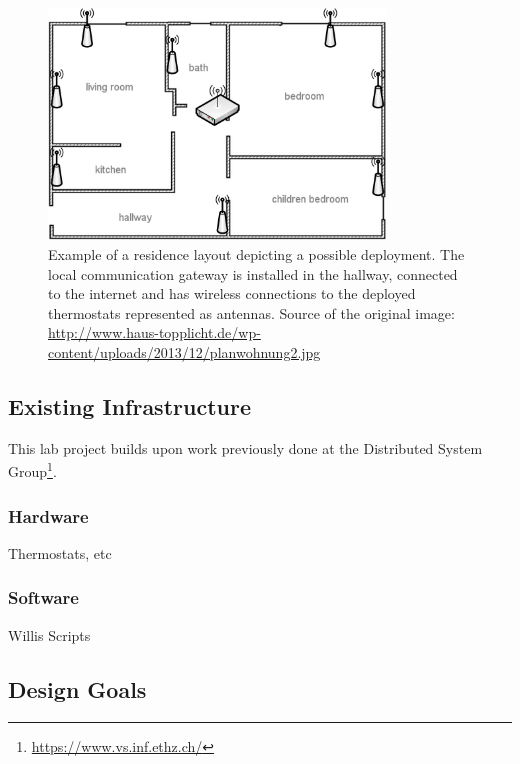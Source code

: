 \begin{figure}[h]
\begin{center}
\includegraphics[width=0.8\textwidth]{images/residence_layout_schema.png}
\end{center}
\caption{Example of a residence layout depicting a possible deployment. The local communication gateway is installed in the hallway, connected to the internet and has wireless connections to the deployed thermostats represented as antennas. Source of the original image: \url{http://www.haus-topplicht.de/wp-content/uploads/2013/12/planwohnung2.jpg}}
\label{fig:residence_layout}
\end{figure}

\subsection{Existing Infrastructure}

This lab project builds upon work previously done at the Distributed System Group\footnote{\url{https://www.vs.inf.ethz.ch/}}. 

\subsubsection*{Hardware}

Thermostats, etc

\subsubsection*{Software}

Willis Scripts

\subsection{Design Goals}

